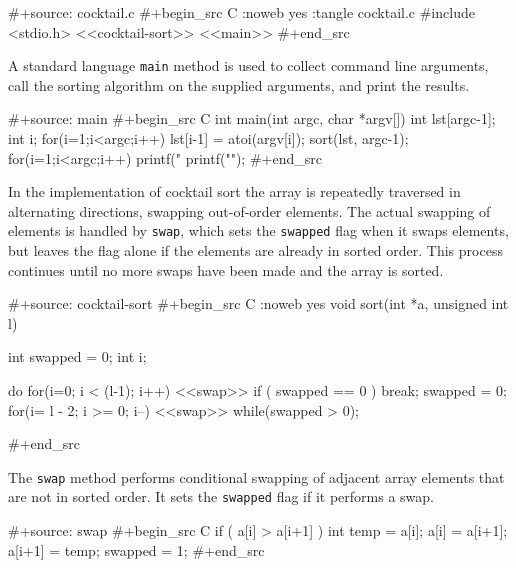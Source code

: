 \documentclass[article,shortnames]{jss}
\begin{document}
\begin{Code}
#+source: cocktail.c
#+begin_src C :noweb yes :tangle cocktail.c
  #include <stdio.h>
  <<cocktail-sort>>
  <<main>>
#+end_src
\end{Code}






A standard  language \texttt{main} method is used to collect command line
arguments, call the sorting algorithm on the supplied arguments, and
print the results.


\begin{Code}
#+source: main
#+begin_src C
  int main(int argc, char *argv[]) {
    int lst[argc-1];
    int i;
    for(i=1;i<argc;i++)
      lst[i-1] = atoi(argv[i]);
    sort(lst, argc-1);
    for(i=1;i<argc;i++)
      printf("%
    printf("\n");
  }
#+end_src
\end{Code}






In the implementation of cocktail sort the array is repeatedly
traversed in alternating directions, swapping out-of-order elements.
The actual swapping of elements is handled by \texttt{swap}, which sets the
\texttt{swapped} flag when it swaps elements, but leaves the flag alone if
the elements are already in sorted order.  This process continues
until no more swaps have been made and the array is sorted.


\begin{Code}
#+source: cocktail-sort
#+begin_src C :noweb yes
  void sort(int *a, unsigned int l)
  {
    int swapped = 0;
    int i;

    do {
      for(i=0; i < (l-1); i++) {
        <<swap>>
      }
      if ( swapped == 0 ) break;
      swapped = 0;
      for(i= l - 2; i >= 0; i--) {
        <<swap>>
      }
    } while(swapped > 0);
  }
#+end_src
\end{Code}






The \texttt{swap} method performs conditional swapping of adjacent array
elements that are not in sorted order.  It sets the \texttt{swapped} flag if
it performs a swap.


\begin{Code}
#+source: swap
#+begin_src C
  if ( a[i] > a[i+1] ) {
    int temp = a[i];
    a[i] = a[i+1];
    a[i+1] = temp;
    swapped = 1;
  }
#+end_src
\end{Code}
\end{document}
